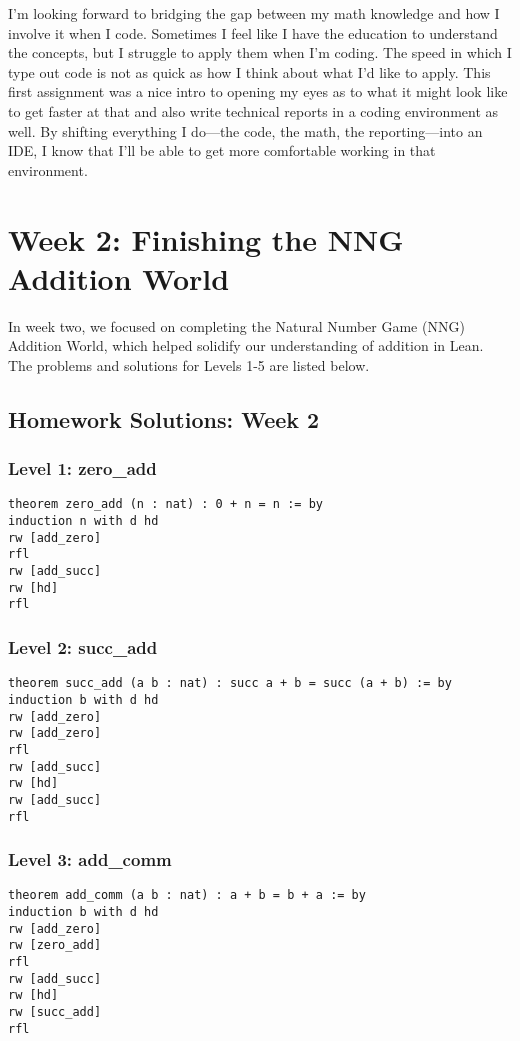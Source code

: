 \documentclass{article}
\begin{document}
I'm looking forward to bridging the gap between my math knowledge and how I involve it when I code. Sometimes I feel like I have the education to understand the concepts, but I struggle to apply them when I'm coding. The speed in which I type out code is not as quick as how I think about what I'd like to apply. This first assignment was a nice intro to opening my eyes as to what it might look like to get faster at that and also write technical reports in a coding environment as well. By shifting everything I do—the code, the math, the reporting—into an IDE, I know that I'll be able to get more comfortable working in that environment.

\section{Week 2: Finishing the NNG Addition World}
\label{sec:week2}

In week two, we focused on completing the Natural Number Game (NNG) Addition World, which helped solidify our understanding of addition in Lean. The problems and solutions for Levels 1-5 are listed below.

\subsection*{Homework Solutions: Week 2}

\subsubsection*{Level 1: zero\_add}
\begin{lstlisting}[style=leanstyle]
theorem zero_add (n : nat) : 0 + n = n := by
induction n with d hd
rw [add_zero]
rfl
rw [add_succ]
rw [hd]
rfl
\end{lstlisting}

\subsubsection*{Level 2: succ\_add}
\begin{lstlisting}[style=leanstyle]
theorem succ_add (a b : nat) : succ a + b = succ (a + b) := by
induction b with d hd
rw [add_zero]
rw [add_zero]
rfl
rw [add_succ]
rw [hd]
rw [add_succ]
rfl
\end{lstlisting}

\subsubsection*{Level 3: add\_comm}
\begin{lstlisting}[style=leanstyle]
theorem add_comm (a b : nat) : a + b = b + a := by
induction b with d hd
rw [add_zero]
rw [zero_add]
rfl
rw [add_succ]
rw [hd]
rw [succ_add]
rfl
\end{lstlisting}
\end{document}
